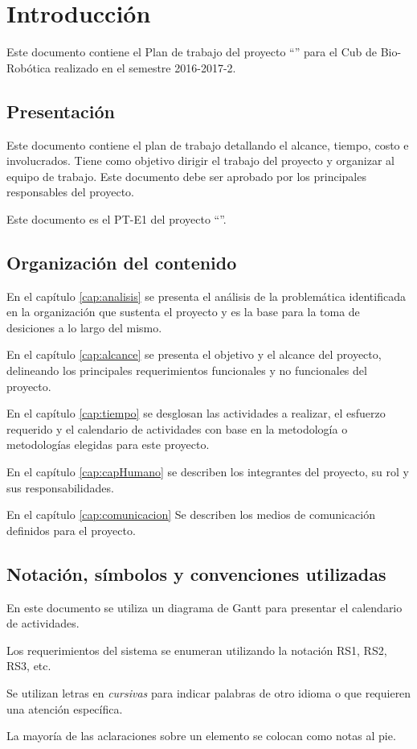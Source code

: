 \chapter{Introducción}

	Este documento contiene el Plan de trabajo del proyecto ``{\em \varProyecto}'' para el Cub de Bio-Robótica realizado en el semestre 2016-2017-2.

\section{Presentación}

	Este documento contiene el plan de trabajo detallando el alcance, tiempo, costo e involucrados. Tiene como objetivo dirigir el trabajo del proyecto y organizar al equipo de trabajo. Este documento debe ser aprobado por los principales responsables del proyecto.
	
	Este documento es el PT-E1 del proyecto ``{\em\varProyecto}''.
	
\section{Organización del contenido}

	En el capítulo \ref{cap:analisis} se presenta el análisis de la problemática identificada en la organización que sustenta el proyecto y es la base para la toma de desiciones a lo largo del mismo.
	
	En el capítulo \ref{cap:alcance} se presenta el objetivo y el alcance del proyecto, delineando los principales requerimientos funcionales y no funcionales del proyecto.
	
	En el capítulo \ref{cap:tiempo} se desglosan las actividades a realizar, el esfuerzo requerido y el calendario de actividades con base en la metodología o metodologías elegidas para este proyecto.
	
	En el capítulo \ref{cap:capHumano} se describen los integrantes del proyecto, su rol y sus responsabilidades.
	
	En el capítulo \ref{cap:comunicacion} Se describen los medios de comunicación definidos para el proyecto.

\section{Notación, símbolos y convenciones utilizadas}

	En este documento se utiliza un diagrama de Gantt para presentar el calendario de actividades.
	
	Los requerimientos del sistema se enumeran utilizando la notación RS1, RS2, RS3, etc.
	
	Se utilizan letras en {\em cursivas} para indicar palabras de otro idioma o que requieren una atención específica. 
	
	La mayoría de las aclaraciones sobre un elemento se colocan como notas al pie.

